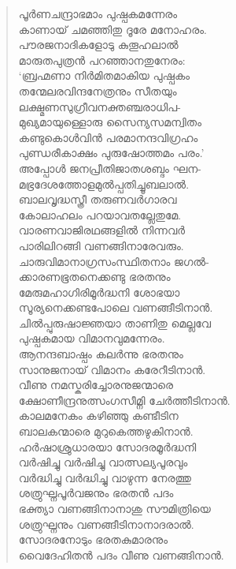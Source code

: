 \begin{verse}
പൂര്‍ണചന്ദ്രാഭമാം പുഷ്പകമന്നേരം\\
കാണായ് ചമഞ്ഞിതു ദൂരേ മനോഹരം.\\
പൗരജനാദികളോടു കുതൂഹലാല്‍\\
മാരുതപുത്രന്‍ പറഞ്ഞാനതുനേരം:\\
‘ബ്രഹ്മണാ നിര്‍മിതമാകിയ പുഷ്പകം\\
തന്മേലരവിന്ദനേത്രനും സീതയും\\
ലക്ഷ്മണസുഗ്രീവനക്തഞ്ചരാധിപ-\\
മുഖ്യമായുള്ളൊരു സൈന്യസമന്വിതം\\
കണ്ടുകൊള്‍വിന്‍ പരമാനന്ദവിഗ്രഹം\\
പുണ്ഡരീകാക്ഷം പുരുഷോത്തമം പരം.’\\
അപ്പോള്‍ ജനപ്രീതിജാതശബ്ദം ഘന-\\
മഭ്രദേശത്തോളമുല്‍പ്പതിച്ചൂബലാല്‍.\\
ബാലവൃദ്ധസ്ത്രീ തരുണവര്‍ഗാരവ\\
കോലാഹലം പറയാവതല്ലേതുമേ.\\
വാരണവാജിരഥങ്ങളില്‍ നിന്നവര്‍\\
പാരിലിറങ്ങി വണങ്ങിനാരേവരും.\\
ചാരുവിമാനാഗ്രസംസ്ഥിതനാം ജഗല്‍-\\
ക്കാരണഭൂതനെക്കണ്ടു ഭരതനും\\
മേരുമഹാഗിരിമൂര്‍ദ്ധനി ശോഭയാ\\
സൂര്യനെക്കണ്ടപോലെ വണങ്ങീടിനാന്‍.\\
ചില്‍പ്പുരുഷാജ്ഞയാ താണിതു മെല്ലവേ\\
പുഷ്പകമായ വിമാനവുമന്നേരം.\\
ആനന്ദബാഷ്പം കലര്‍ന്നു ഭരതനും\\
സാനുജനായ് വിമാനം കരേറീടിനാന്‍.\\
വീണു നമസ്കരിച്ചോരനുജന്മാരെ\\
ക്ഷോണീന്ദ്രനുത്സംഗസീമ്നി ചേര്‍ത്തീടിനാന്‍.\\
കാലമനേകം കഴിഞ്ഞു കണ്ടീടിന\\
ബാലകന്മാരെ മുറുകെത്തഴുകിനാന്‍.\\
ഹര്‍ഷാശ്രുധാരയാ സോദരമൂര്‍ദ്ധനി\\
വര്‍ഷിച്ചു വര്‍ഷിച്ചു വാത്സല്യപൂരവും\\
വര്‍ദ്ധിച്ചു വര്‍ദ്ധിച്ചു വാഴുന്ന നേരത്തു\\
ശത്രുഘ്നപൂര്‍വജനും ഭരതന്‍ പദം\\
ഭക്ത്യാ വണങ്ങിനാനാശു സൗമിത്രിയെ\\
ശത്രുഘ്നനും വണങ്ങീടിനാനാദരാല്‍.\\
സോദരനോടും ഭരതകുമാരനും\\
വൈദേഹിതന്‍ പദം വീണു വണങ്ങിനാന്‍.\\

\end{verse}
